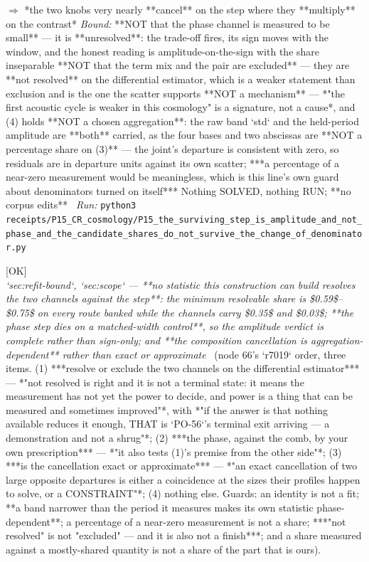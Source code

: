 \begin{description}
\ensuremath{\Rightarrow} *the two knobs very nearly **cancel** on the step where they **multiply** on the contrast*
 \emph{Bound:}  **NOT that the phase channel is measured to be small** --- it is **unresolved**: the trade-off fires, its sign moves with the window, and the honest reading is amplitude-on-the-sign with the share inseparable  **NOT that the term mix and the pair are excluded** --- they are **not resolved** on the differential estimator, which is a weaker statement than exclusion and is the one the scatter supports  **NOT a mechanism** --- *"the first acoustic cycle is weaker in this cosmology" is a signature, not a cause*, and (4) holds  **NOT a chosen aggregation**: the raw band `std` and the held-period amplitude are **both** carried, as the four bases and two abscissas are  **NOT a percentage share on (3)** --- the joint's departure is consistent with zero, so residuals are in departure units against its own scatter; ***a percentage of a near-zero measurement would be meaningless, which is this line's own guard about denominators turned on itself***  Nothing SOLVED, nothing RUN; **no corpus edits**
\ \emph{Run:} \texttt{python3 receipts/P15\_CR\_cosmology/P15\_the\_surviving\_step\_is\_amplitude\_and\_not\_phase\_and\_the\_candidate\_shares\_do\_not\_survive\_the\_change\_of\_denominator.py}
\item[\rcptlabel{P15_no_statistic_this_construction_can_build_resolves_the_two_channels_and_the_phase_step_dies_on_a_matched_width_control}{P15R208}\textbf{P15R208}\quad\texttt{P15\_no\_statistic\_this\_construction\_can\_build\_resolves\_the\_two\_channels\_and\_the\_phase\_step\_dies\_on\_a\_matched\_width\_control}]\hfill\textsf{[OK]}\\
\textit{`sec:refit-bound`, `sec:scope` --- **no statistic this construction can build resolves the two channels against the step**: the minimum resolvable share is \$0.59\$--\$0.75\$ on every route banked while the channels carry \$0.35\$ and \$0.03\$; **the phase step dies on a matched-width control**, so the amplitude verdict is complete rather than sign-only; and **the composition cancellation is aggregation-dependent** rather than exact or approximate} \ (node 66's `r7019` order, three items. (1) ***resolve or exclude the two channels on the differential estimator*** --- *"not resolved is right and it is not a terminal state: it means the measurement has not yet the power to decide, and power is a thing that can be measured and sometimes improved"*, with *"if the answer is that nothing available reduces it enough, THAT is `PO-56`'s terminal exit arriving --- a demonstration and not a shrug"*; (2) ***the phase, against the comb, by your own prescription*** --- *"it also tests (1)'s premise from the other side"*; (3) ***is the cancellation exact or approximate*** --- *"an exact cancellation of two large opposite departures is either a coincidence at the sizes their profiles happen to solve, or a CONSTRAINT"*; (4) nothing else.  Guards: an identity is not a fit; **a band narrower than the period it measures makes its own statistic phase-dependent**; a percentage of a near-zero measurement is not a share; ***"not resolved" is not "excluded" --- and it is also not a finish***; and a share measured against a mostly-shared quantity is not a share of the part that is ours). 

\end{description}
